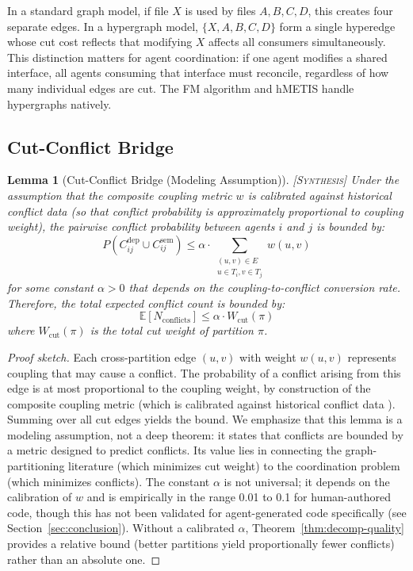\documentclass[11pt]{article}
\newtheorem{lemma}[theorem]{Lemma}
\theoremstyle{definition}
\theoremstyle{remark}
\newcommand{\synthesis}{\textsc{[Synthesis]}}
\begin{document}
In a standard graph model, if file $X$ is used by files $A, B, C, D$, this creates four separate edges.
In a hypergraph model, $\{X, A, B, C, D\}$ form a single hyperedge whose cut cost reflects that modifying $X$ affects all consumers simultaneously.
This distinction matters for agent coordination: if one agent modifies a shared interface, all agents consuming that interface must reconcile, regardless of how many individual edges are cut.
The FM algorithm and hMETIS handle hypergraphs natively.

\subsection{Cut-Conflict Bridge}

\begin{lemma}[Cut-Conflict Bridge (Modeling Assumption)] \synthesis{}
\label{lem:bridge}
Under the assumption that the composite coupling metric $w$ is calibrated against historical conflict data (so that conflict probability is approximately proportional to coupling weight), the pairwise conflict probability between agents $i$ and $j$ is bounded by:
\begin{equation}
  P(C_{ij}^{\mathrm{dep}} \cup C_{ij}^{\mathrm{sem}}) \leq \alpha \cdot \sum_{\substack{(u,v) \in E \\ u \in T_i, v \in T_j}} w(u,v)
\end{equation}
for some constant $\alpha > 0$ that depends on the coupling-to-conflict conversion rate.
Therefore, the total expected conflict count is bounded by:
\begin{equation}
  \mathbb{E}[N_{\mathrm{conflicts}}] \leq \alpha \cdot W_{\mathrm{cut}}(\pi)
\end{equation}
where $W_{\mathrm{cut}}(\pi)$ is the total cut weight of partition $\pi$.
\end{lemma}

\begin{proof}[Proof sketch]
Each cross-partition edge $(u,v)$ with weight $w(u,v)$ represents coupling that may cause a conflict.
The probability of a conflict arising from this edge is at most proportional to the coupling weight, by construction of the composite coupling metric (which is calibrated against historical conflict data \citep{KasiSarma2013}).
Summing over all cut edges yields the bound.
We emphasize that this lemma is a modeling assumption, not a deep theorem: it states that conflicts are bounded by a metric designed to predict conflicts. Its value lies in connecting the graph-partitioning literature (which minimizes cut weight) to the coordination problem (which minimizes conflicts). The constant $\alpha$ is not universal; it depends on the calibration of $w$ and is empirically in the range 0.01 to 0.1 for human-authored code, though this has not been validated for agent-generated code specifically (see Section~\ref{sec:conclusion}). Without a calibrated $\alpha$, Theorem~\ref{thm:decomp-quality} provides a relative bound (better partitions yield proportionally fewer conflicts) rather than an absolute one.
\end{proof}
\end{document}
